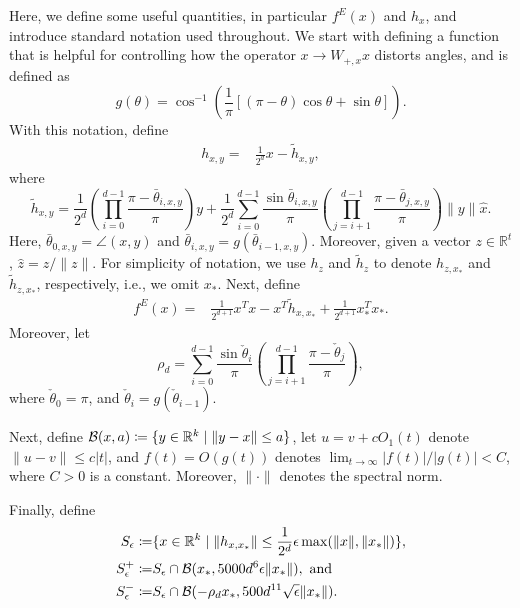 Here, we define some useful quantities, in particular ${f^E}(x)$ and $h_x$, and introduce standard notation used throughout.
We start with defining a function that is helpful for controlling how the operator $x \to W_{+,x}x$ distorts angles, and is defined as
\[
g(\theta) = \cos^{-1}\left(\frac{1}{\pi}\left[ (\pi - \theta) \cos \theta + \sin \theta \right]\right).
\]
With this notation, define
\begin{align*}
h_{x, y} =& \frac{1}{2^d} x - \tilde{h}_{x, y},
\end{align*}
where
\[
\tilde{h}_{x, y} = \frac{1}{2^d} \left( \prod_{i = 0}^{d - 1} \frac{\pi - \bar{\theta}_{i, x, y}}{\pi} \right) y + \frac{1}{2^d} \sum_{i = 0}^{d - 1} \frac{\sin \bar{\theta}_{i, x, y}}{\pi} \left( \prod_{j = i + 1}^{d-1} \frac{\pi - \bar{\theta}_{j, x, y}}{\pi} \right) \|y\| \hat{x}.
\]
Here, $\bar{\theta}_{0, x, y} =  \angle(x, y)$ and  $\bar{\theta}_{i, x, y} = g(\bar{\theta}_{i - 1, x, y})$.
Moreover, given a vector $z \in \mathbb{R}^t$, $\hat{z} = {z} / \|{z}\|$.
For simplicity of notation, we use $h_{z}$ and $\tilde{h}_z$ to denote $h_{z, x_*}$ and $\tilde{h}_{z, x_*}$, respectively, i.e., we omit $x_*$.
Next, define
\begin{align*}
{f^E}(x) =& \frac{1}{2^{d+1}} x^T x - x^T \tilde{h}_{x, x_*} + \frac{1}{2^{d+1}} x_*^T x_*.
\end{align*}
Moreover, let
\[
\rho_d =  \sum_{i = 0}^{d - 1} \frac{\sin \check{\theta}_i}{\pi} \left(\prod_{j = i + 1}^{d - 1} \frac{\pi - \check{\theta}_j}{\pi}\right),
\]
where $\check\theta_0 = \pi$, and $\check{\theta}_i = g(\check{\theta}_{i-1})$. %





Next, define $\mathcal{B}(x, a) \coloneqq \{y \in \mathbb{R}^k \mid \|y - x\| \leq a\}$,
let $u = v + c O_1(t)$ denote $\|u - v\| \leq c |t|$,
and $f(t) = O(g(t))$ denotes $\lim_{t \rightarrow \infty} |f(t)| / |g(t)| < C$, where $C>0$ is a constant.
Moreover, $\|\cdot\|$ denotes the spectral norm.


Finally, define
\begin{align*}
S_{\epsilon} \coloneqq&  \{x \in \mathbb{R}^k \mid \|h_{x, x_*}\| \leq \frac{1}{2^d} \epsilon \max(\|x\|, \|x_*\|)\}, \\
S_{\epsilon}^+ \coloneqq&  S_{\epsilon} \cap \mathcal{B}(x_*, 5000 d^6 \epsilon \|x_*\|  ),  \hbox{ and } \\
S_{\epsilon}^- \coloneqq&  S_{\epsilon} \cap \mathcal{B}( - \rho_d x_*, 500 d^{11} \sqrt{\epsilon} \|x_*\|). \\
\end{align*}

